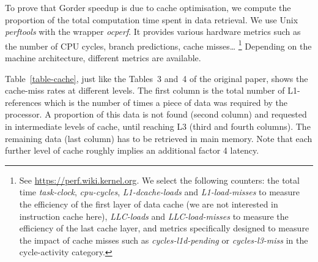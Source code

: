 To prove that Gorder speedup is due to cache optimisation, we compute the proportion of the total computation time spent in data retrieval. 
%
We use Unix \textit{perftools} with the wrapper \textit{ocperf}. 
It provides various hardware metrics such as the number of CPU cycles, branch predictions, cache misses\ldots
%
\footnote{See \url{https://perf.wiki.kernel.org}. We select the following counters:
the total time \textit{task-clock}, \textit{cpu-cycles}, \textit{L1-dcache-loads} and \textit{L1-load-misses} to measure the efficiency of the first layer of data cache (we are not interested in instruction cache here), \textit{LLC-loads} and \textit{LLC-load-misses} to measure the efficiency of the last cache layer, and metrics specifically designed to measure the impact of cache misses such as \textit{cycles-l1d-pending} or \textit{cycles-l3-miss} in the cycle-activity category.}
%
Depending on the machine architecture, different metrics are available.
%
\begin{table}[bt]

\caption{
    \textbf{Cache statistics measured for PageRank algorithm.} L1-ref (references): number of times a piece of data was required by the processor and searched in level 1 of cache. L1-mr (miss-rate): proportion of data that was not found in L1. L3-ref: number of references to the third (lowest) level of cache after data was not found in levels 1 and 2. L3-r (ratio): proportion of data that was not found in L1 nor L2, then searched in L3. Cache-mr: proportion of data that was not found in cache (L1, L2 or L3) and had to be retrieved in main memory. Compare to Tables~3 and~4 in~\cite{gorder}.
}
\label{table-cache}
\end{table}


Table~\ref{table-cache}, just like the Tables~3 and~4 of the original paper, shows the cache-miss rates at different levels. The first column is the total number of L1-references which is the number of times a piece of data was required by the processor. A proportion of this data is not found (second column) and requested in intermediate levels of cache, until reaching L3 (third and fourth columns). The remaining data (last column) has to be retrieved in main memory. Note that each further level of cache roughly implies an additional factor 4 latency. 

